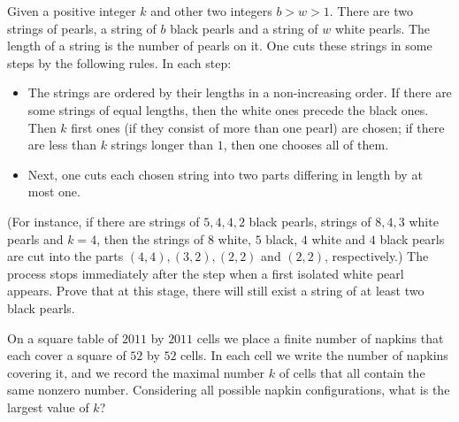 



\renewcommand{\theenumi}{\alph{enumi}}



\noindent
 
\filbreak




\begin{problem}
Given a positive integer $k$ and other two integers $b > w > 1$. 
There are two strings of pearls, a string of $b$ black pearls and a string of $w$ white pearls. 
The length of a string is the number of pearls on it.
One cuts these strings in some steps by the following rules. In each step:
\begin {itemize}
\item The strings are ordered by their lengths in a non-increasing order. If there are some strings of equal lengths, then the white ones precede the black ones. Then $k$ first ones (if they
consist of more than one pearl) are chosen; if there are less than $k$ strings longer than $1$, then one chooses all of them.
\item Next, one cuts each chosen string into two parts differing in length by at most one.
\end{itemize}
(For instance, if there are strings of $5, 4, 4, 2$ black pearls, strings of $8, 4, 3$ white pearls and $k = 4$, then the strings of $8$ white, $5$ black, $4$ white and $4$ black pearls are cut into the parts $(4, 4), (3, 2), (2, 2)$ and $(2, 2)$, respectively.)
The process stops immediately after the step when a first isolated white pearl appears.
Prove that at this stage, there will still exist a string of at least two black pearls.

\end{problem}

\begin{problem}
On a square table of $2011$ by $2011$ cells we place a finite number of napkins that each cover a square of $52$ by $52$ cells. In each cell we write the number of napkins covering it, and we record the maximal number $k$ of cells that all contain the same nonzero number. Considering all possible napkin configurations, what is the largest value of $k$?

\end{problem}


%


